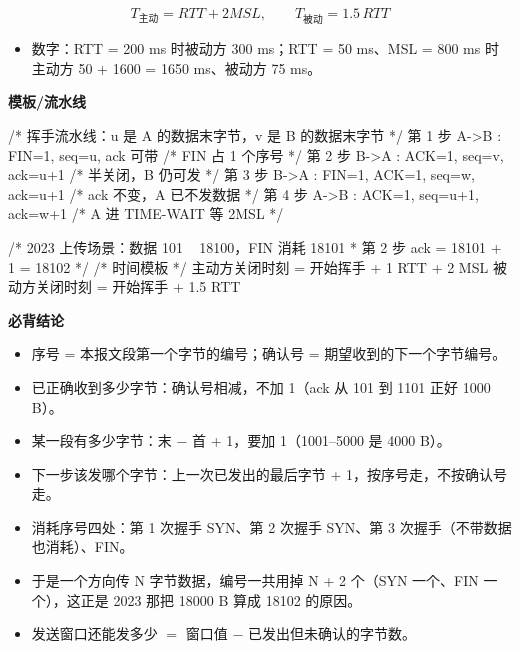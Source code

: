 \documentclass[10pt,a4paper]{ctexart}
\begin{document}
\[
T_{主动}=RTT+2MSL,\qquad T_{被动}=1.5\,RTT
\]

\begin{itemize}

\item 数字：RTT = 200 ms 时被动方 300 ms；RTT = 50 ms、MSL = 800 ms 时主动方 50 + 1600 = 1650 ms、被动方 75 ms。

\end{itemize}

\textbf{模板/流水线}

\begin{codebox}
/* 挥手流水线：u 是 A 的数据末字节，v 是 B 的数据末字节 */
第 1 步 A->B : FIN=1,            seq=u,   ack 可带    /* FIN 占 1 个序号 */
第 2 步 B->A : ACK=1,            seq=v,   ack=u+1     /* 半关闭，B 仍可发 */
第 3 步 B->A : FIN=1, ACK=1,     seq=w,   ack=u+1     /* ack 不变，A 已不发数据 */
第 4 步 A->B : ACK=1,            seq=u+1, ack=w+1     /* A 进 TIME-WAIT 等 2MSL */

/* 2023 上传场景：数据 101 ~ 18100，FIN 消耗 18101
 * 第 2 步 ack = 18101 + 1 = 18102
 */
/* 时间模板 */
主动方关闭时刻 = 开始挥手 + 1 RTT + 2 MSL
被动方关闭时刻 = 开始挥手 + 1.5 RTT
\end{codebox}




\textbf{必背结论}

\begin{itemize}

\item 序号 = 本报文段第一个字节的编号；确认号 = 期望收到的下一个字节编号。

\item 已正确收到多少字节：确认号相减，不加 1（ack 从 101 到 1101 正好 1000 B）。

\item 某一段有多少字节：末 − 首 + 1，要加 1（1001–5000 是 4000 B）。

\item 下一步该发哪个字节：上一次已发出的最后字节 + 1，按序号走，不按确认号走。

\item 消耗序号四处：第 1 次握手 SYN、第 2 次握手 SYN、第 3 次握手（不带数据也消耗）、FIN。

\item 于是一个方向传 N 字节数据，编号一共用掉 N + 2 个（SYN 一个、FIN 一个），这正是 2023 那把 18000 B 算成 18102 的原因。

\item 发送窗口还能发多少 $=$ 窗口值 $-$ 已发出但未确认的字节数。

\end{itemize}
\end{document}
